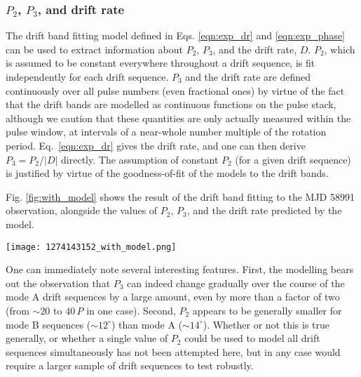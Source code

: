 \documentclass[twocolumn]{aastex631}
\begin{document}
\subsubsection{$P_2$, $P_3$, and drift rate}
\label{sec:P2P3DR}

The drift band fitting model defined in Eqs. \eqref{eqn:exp_dr} and \eqref{eqn:exp_phase} can be used to extract information about $P_2$, $P_3$, and the drift rate, $D$.
$P_2$, which is assumed to be constant everywhere throughout a drift sequence, is fit independently for each drift sequence.
$P_3$ and the drift rate are defined continuously over all pulse numbers (even fractional ones) by virtue of the fact that the drift bands are modelled as continuous functions on the pulse stack, although we caution that these quantities are only actually measured within the pulse window, at intervals of a near-whole number multiple of the rotation period.
Eq.~\eqref{eqn:exp_dr} gives the drift rate, and one can then derive $P_3 = P_2/|D|$ directly.
The assumption of constant $P_2$ (for a given drift sequence) is justified by virtue of the goodness-of-fit of the models to the drift bands.

Fig. \ref{fig:with_model} shows the result of the drift band fitting to the MJD 58991 observation, alongside the values of $P_2$, $P_3$, and the drift rate predicted by the model.
\begin{figure*}[!tp]
    \centering
    \texttt{[image: 1274143152\_with\_model.png]}
    \caption{\textbf{Left:} The pulse stack of MJD 58991 (right panel of Fig \ref{fig:pulsestacks}), with the drift bands modelled with an exponentially decaying drift rate. \textbf{Right:} The $P_2$, instantaneous $P_3$, and instantaneous drift rates derived from the model. In the $P_2$ panel, the vertical error bars indicate the error on the fitted $P_2$ value, and the horizontal error bars only indicate the extent of the associated drift sequence.}
    \label{fig:with_model}
\end{figure*}
One can immediately note several interesting features.
First, the modelling bears out the observation that $P_3$ can indeed change gradually over the course of the mode A drift sequences by a large amount, even by more than a factor of two (from $\sim20$ to $40\,P$ in one case).
Second, $P_2$ appears to be generally smaller for mode B sequences ($\sim12^\circ$) than mode A ($\sim14^\circ$).
Whether or not this is true generally, or whether a single value of $P_2$ could be used to model all drift sequences simultaneously has not been attempted here, but in any case would require a larger sample of drift sequences to test robustly.
\end{document}
